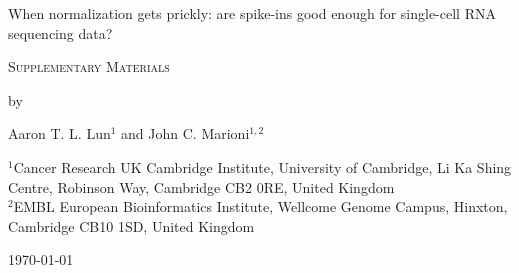 \documentclass{article}
\begin{document}
\begin{titlepage}
\vspace*{3cm}
\begin{center}

{\LARGE
When normalization gets prickly: are spike-ins good enough for single-cell RNA sequencing data?
\par}

\vspace{0.75cm}

{\Large 
    \textsc{Supplementary Materials}
\par
}
\vspace{0.75cm}

\large
by


\vspace{0.75cm}
Aaron T. L. Lun$^{1}$ and John C. Marioni$^{1,2}$

\vspace{1cm}
\begin{minipage}{0.9\textwidth}
\begin{flushleft} 
$^1$Cancer Research UK Cambridge Institute, University of Cambridge, Li Ka Shing Centre, Robinson Way, Cambridge CB2 0RE, United Kingdom \\[6pt]
$^2$EMBL European Bioinformatics Institute, Wellcome Genome Campus, Hinxton, Cambridge CB10 1SD, United Kingdom \\[6pt]
\end{flushleft}
\end{minipage}

\vspace{1.5cm}
{\large \today{}}

\vspace*{\fill}
\end{center}
\end{titlepage}
\end{document}

